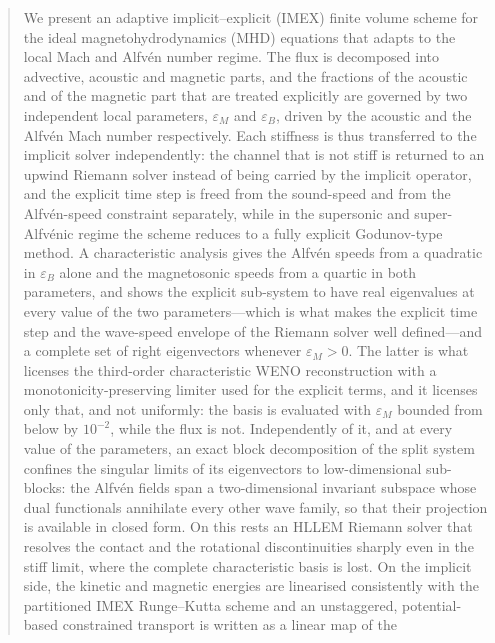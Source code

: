 \documentclass[a4paper,fleqn]{cas-sc}
\theoremstyle{remark}
\newcommand{\eps}{\varepsilon}
\newcommand{\epsM}{\eps_{M}}
\newcommand{\epsB}{\eps_{B}}
\begin{document}
\fntext[1]{}


\begin{abstract}
We present an adaptive implicit--explicit (IMEX) finite volume scheme for the
ideal magnetohydrodynamics (MHD) equations that adapts to the local Mach and
Alfv\'en number regime. The flux is decomposed into advective,
acoustic and magnetic parts, and the fractions of the acoustic and of the
magnetic part that are treated explicitly are governed by two independent local
parameters, $\epsM$ and $\epsB$, driven by the acoustic and the Alfv\'en Mach
number respectively. Each stiffness is thus transferred to the implicit solver
independently: the channel that is not stiff is returned to an upwind Riemann
solver instead of being carried by the implicit operator, and the explicit time
step is freed from the sound-speed and from the Alfv\'en-speed constraint
separately, while in the supersonic and super-Alfv\'enic regime the scheme
reduces to a fully explicit Godunov-type method. A characteristic analysis gives
the Alfv\'en speeds from a quadratic in $\epsB$ alone and the magnetosonic speeds
from a quartic in both parameters, and shows the explicit sub-system to have real eigenvalues at every value of
the two parameters---which is what makes the explicit time step and the
wave-speed envelope of the Riemann solver well defined---and a complete set of
right eigenvectors whenever $\epsM>0$. The latter is what licenses the third-order characteristic WENO
reconstruction with a monotonicity-preserving limiter used for the explicit
terms, and it licenses only that, and not uniformly: the basis is evaluated
with $\epsM$ bounded from below by $10^{-2}$, while the flux is not.
Independently of it, and at every value of the parameters, an exact block
decomposition of the split system confines the singular limits of its
eigenvectors to low-dimensional sub-blocks: the Alfv\'en fields span a
two-dimensional invariant subspace whose dual functionals annihilate every
other wave family, so that their projection is available in closed form. On
this rests an HLLEM Riemann solver that resolves the contact and the rotational
discontinuities sharply even in the stiff limit, where the complete
characteristic basis is lost. On
the implicit side, the kinetic and magnetic energies are linearised consistently
with the partitioned IMEX Runge--Kutta scheme and an unstaggered,
potential-based constrained transport is written as a linear map of the

\end{abstract}
\end{document}
